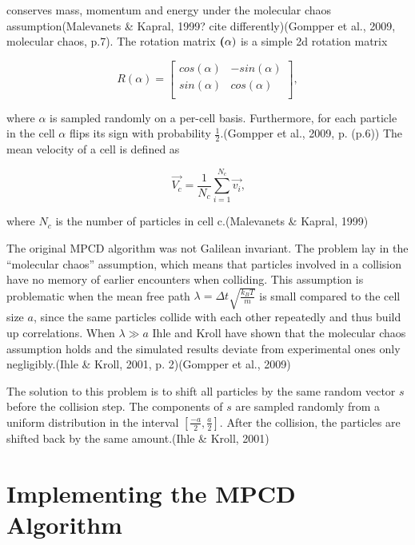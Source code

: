 \documentclass[
]{article}
\begin{document}
conserves mass, momentum and energy under the molecular chaos
assumption(Malevanets \& Kapral, 1999? cite differently)(Gompper et al.,
2009, molecular chaos, p.7). The rotation matrix \(\textbf(\alpha)\) is
a simple 2d rotation matrix

\begin{equation}
R(\alpha) = 
\left[ \begin{array}{rr}
cos(\alpha) & -sin(\alpha) \\
sin(\alpha) & cos(\alpha) \\
\end{array}\right],
\end{equation}

where \(\alpha\) is sampled randomly on a per-cell basis. Furthermore,
for each particle in the cell \(\alpha\) flips its sign with probability
\(\frac{1}{2}\).(Gompper et al., 2009, p. (p.6)) The mean velocity of a
cell is defined as

\begin{equation}
\vec{V_c} = \frac{1}{N_c} \sum_{i=1}^{N_c} \vec{v_i} \textrm{,}
\end{equation}

where \(N_c\) is the number of particles in cell c.(Malevanets \&
Kapral, 1999)

The original MPCD algorithm was not Galilean invariant. The problem lay
in the ``molecular chaos'' assumption, which means that particles
involved in a collision have no memory of earlier encounters when
colliding. This assumption is problematic when the mean free path
\(\lambda = \Delta t \sqrt{\frac{k_{B}T}{m}}\) is small compared to the
cell size \(a\), since the same particles collide with each other
repeatedly and thus build up correlations. When \(\lambda \gg a\) Ihle
and Kroll have shown that the molecular chaos assumption holds and the
simulated results deviate from experimental ones only negligibly.(Ihle
\& Kroll, 2001, p. 2)(Gompper et al., 2009)

The solution to this problem is to shift all particles by the same
random vector \(s\) before the collision step. The components of \(s\)
are sampled randomly from a uniform distribution in the interval
\([\frac{-a}{2}, \frac{a}{2}]\). After the collision, the particles are
shifted back by the same amount.(Ihle \& Kroll, 2001)

\hypertarget{implementing-the-mpcd-algorithm}{%
\section{Implementing the MPCD
Algorithm}\label{implementing-the-mpcd-algorithm}}
\end{document}
